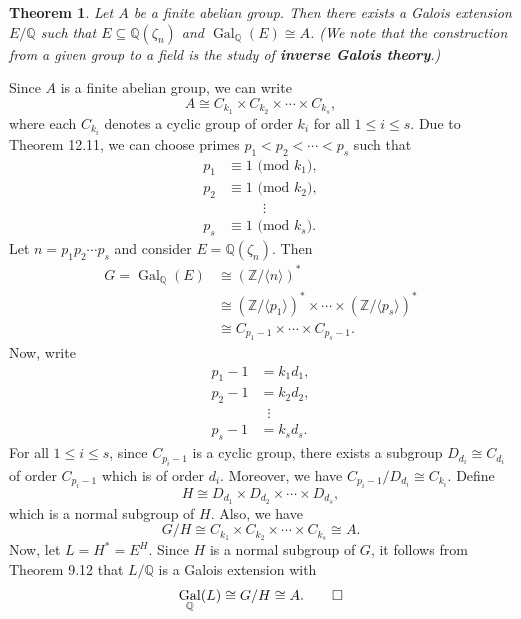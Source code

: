 \documentclass[10pt]{article}
\makeatletter
\newcommand{\Z}{\mathbb{Z}}
\newcommand{\Q}{\mathbb{Q}}
\DeclareMathOperator{\Gal}{Gal}
\theoremstyle{newstyle}
\newtheorem{thm}{Theorem}[section]
\newenvironment{pf}[1][\proofname]{\par
  \pushQED{\qed}%
  \normalfont \topsep0\p@\relax
  \trivlist
  \item[\hskip\labelsep\scshape
  #1\@addpunct{.}]\ignorespaces
}{%
  \popQED\endtrivlist\@endpefalse
}
\makeatother
\begin{document}
\begin{thm}
Let $A$ be a finite abelian group. Then there exists a Galois extension $E/\Q$ such that 
$E \subseteq \Q(\zeta_n)$ and $\Gal_{\Q}(E) \cong A$. (We note that the construction from a 
given group to a field is the study of {\bf inverse Galois theory}.)
\end{thm}
\begin{pf}
Since $A$ is a finite abelian group, we can write 
\[ A \cong C_{k_1} \times C_{k_2} \times \cdots \times C_{k_s}, \]
where each $C_{k_i}$ denotes a cyclic group of order $k_i$ for all $1 \leq i \leq s$. 
Due to Theorem 12.11, we can choose primes $p_1 < p_2 < \cdots < p_s$ such that 
\begin{align*}
    p_1 &\equiv 1 \text{ (mod $k_1$)}, \\
    p_2 &\equiv 1 \text{ (mod $k_2$)}, \\
    & \quad \quad\;\; \vdots \\
    p_s &\equiv 1 \text{ (mod $k_s$)}. 
\end{align*}
Let $n = p_1p_2 \cdots p_s$ and consider $E = \Q(\zeta_n)$. Then 
\begin{align*}
    G = \Gal_{\Q}(E) &\cong (\Z/\langle n \rangle)^* \\
    &\cong (\Z/\langle p_1 \rangle)^* \times \cdots \times (\Z/\langle p_s \rangle)^* \\
    &\cong C_{p_1-1} \times \cdots \times C_{p_s-1}. 
\end{align*}
Now, write 
\begin{align*}
    p_1 - 1 &= k_1d_1, \\
    p_2 - 1 &= k_2d_2, \\
    & \;\;\vdots \\
    p_s - 1 &= k_sd_s. 
\end{align*}
For all $1 \leq i \leq s$, since $C_{p_i-1}$ is a cyclic group, there exists a subgroup 
$D_{d_i} \cong C_{d_i}$ of order $C_{p_i-1}$ which is of order $d_i$. Moreover, we have 
$C_{p_i-1}/D_{d_i} \cong C_{k_i}$. Define 
\[ H \cong D_{d_1} \times D_{d_2} \times \cdots \times D_{d_s}, \]
which is a normal subgroup of $H$. Also, we have 
\[ G/H \cong C_{k_1} \times C_{k_2} \times \cdots \times C_{k_s} \cong A. \] 
Now, let $L = H^* = E^H$. Since $H$ is a normal subgroup of $G$, it follows from Theorem 9.12 that 
$L/\Q$ is a Galois extension with 
\[ \Gal_{\Q}(L) \cong G/H \cong A. \qedhere \]
\end{pf}
\end{document}
